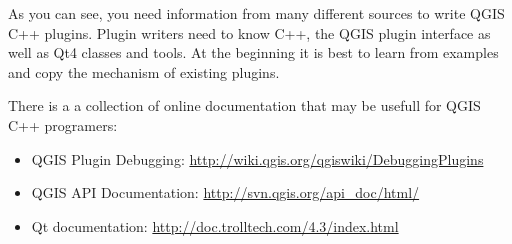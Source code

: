 As you can see, you need information from many different sources to write QGIS C++ 
plugins. Plugin writers need to know C++, the QGIS plugin interface as 
well as Qt4 classes and tools. At the beginning it is best to learn from 
examples and copy the mechanism of existing plugins. 

There is a a collection of online documentation that may be usefull for
QGIS C++ programers:

\begin{itemize}
\item QGIS Plugin Debugging: \url{http://wiki.qgis.org/qgiswiki/DebuggingPlugins}
\item QGIS API Documentation: \url{http://svn.qgis.org/api_doc/html/}
\item Qt documentation: \url{http://doc.trolltech.com/4.3/index.html}
\end{itemize}

